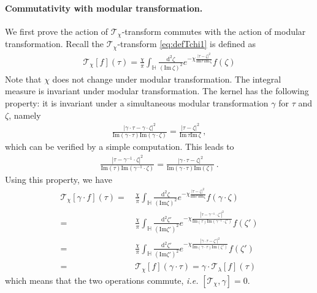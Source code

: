 \documentclass[aps,twocolumn,prl,showpacs,amsmath,amssymb,10pt]{revtex4-2}
\newcommand\rd{{\mathrm{d}}}
\begin{document}
\paragraph{Commutativity with modular transformation.}
We first prove the action of $\mathcal{T}_{\chi}$-transform commutes with the action of modular transformation. Recall the $\mathcal{T}_{\chi}$-transform \eqref{eq:defTchi1} is defined as
\begin{align}
\mathcal{T}_{\chi}[f](\tau)=\frac{\chi}{\pi}\int_{\mathbb{H}}\frac{\rd^2\zeta}{(\text{Im}\,\zeta)^2}e^{-\chi\frac{|\tau-\zeta|^2}{\text{Im}\tau\,\text{Im}\,\zeta}}f(\zeta)
\end{align}
Note that $\chi$ does not change under modular transformation. The integral measure is invariant under modular transformation. The kernel has the following property: it is invariant under a simultaneous modular transformation $\gamma$ for $\tau$ and $\zeta$, namely
\begin{align}
\frac{|\gamma\cdot\tau-\gamma\cdot\zeta|^2}{\text{Im}(\gamma\cdot\tau)\text{Im}(\gamma\cdot\zeta)}=\frac{|\tau-\zeta|^2}{\text{Im}\,\tau\text{Im}\,\zeta}\,,
\end{align}
which can be verified by a simple computation. This leads to
\begin{align}
\frac{|\tau-\gamma^{-1}\cdot\zeta|^2}{\text{Im}(\tau)\text{Im}(\gamma^{-1}\cdot\zeta)}=\frac{|\gamma\cdot\tau-\zeta|^2}{\text{Im}(\gamma\cdot\tau)\text{Im}(\zeta)}\,.
\end{align}
Using this property, we have
\begin{align*}
\mathcal{T}_{\chi}[\gamma\cdot f](\tau)=&\,\frac{\chi}{\pi}\int_{\mathbb{H}}\frac{\rd^2\zeta}{(\text{Im}\zeta)^2}e^{-\chi\frac{|\tau-\zeta|^2}{\text{Im}\tau\,\text{Im}\zeta}}f(\gamma\cdot\zeta)\\\nonumber
=&\,\frac{\chi}{\pi}\int_{\mathbb{H}}\frac{\rd^2\zeta'}{(\text{Im}\zeta')^2}e^{-\chi\frac{|\tau-\gamma^{-1}\cdot\zeta'|^2}{\text{Im}(\tau)\text{Im}(\gamma^{-1}\cdot\zeta')}}f(\zeta')\\\nonumber
=&\,\frac{\chi}{\pi}\int_{\mathbb{H}}\frac{\rd^2\zeta'}{(\text{Im}\zeta')^2}e^{-\chi\frac{|\gamma\cdot\tau-\zeta'|^2}{\text{Im}(\gamma\cdot\tau)\text{Im}(\zeta')}}f(\zeta')\\\nonumber
=&\,\mathcal{T}_{\chi}[f](\gamma\cdot\tau)=\gamma\cdot \mathcal{T}_{\lambda}[f](\tau)
\end{align*}
which means that the two operations commute, \emph{i.e.} $[\mathcal{T}_{\chi},\gamma]=0$.
\vspace{0.3cm}
\end{document}

